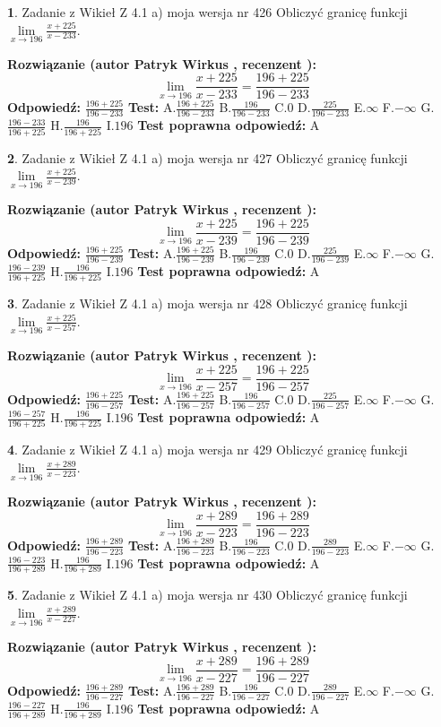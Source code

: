 \documentclass[12pt, a4paper]{article}
\theoremstyle{definition} %
\newtheorem{zad}{}
\newcommand{\zadStart}[1]{\begin{zad}#1\newline}
\newcommand{\zadStop}{\end{zad}}
\newcommand{\rozwStart}[2]{\noindent \textbf{Rozwiązanie (autor #1 , recenzent #2): }\newline}
\newcommand{\rozwStop}{\newline}
\newcommand{\odpStart}{\noindent \textbf{Odpowiedź:}\newline}
\newcommand{\odpStop}{\newline}
\newcommand{\testStart}{\noindent \textbf{Test:}\newline}
\newcommand{\testStop}{\newline}
\newcommand{\kluczStart}{\noindent \textbf{Test poprawna odpowiedź:}\newline}
\newcommand{\kluczStop}{\newline}
\begin{document}
\zadStart{Zadanie z Wikieł Z 4.1 a) moja wersja nr 426}
Obliczyć granicę funkcji $\lim\limits_{x\to196}\frac{x+225}{x-233}$.
\zadStop
\rozwStart{Patryk Wirkus}{}
$$\lim\limits_{x\to196}\frac{x+225}{x-233} = \frac{196+225}{196-233}$$
\rozwStop
\odpStart
$\frac{196+225}{196-233}$
\odpStop
\testStart
A.$\frac{196+225}{196-233}$
B.$\frac{196}{196-233}$
C.$0$
D.$\frac{225}{196-233}$
E.$\infty$
F.$-\infty$
G.$\frac{196-233}{196+225}$
H.$\frac{196}{196+225}$
I.$196$
\testStop
\kluczStart
A
\kluczStop



\zadStart{Zadanie z Wikieł Z 4.1 a) moja wersja nr 427}
Obliczyć granicę funkcji $\lim\limits_{x\to196}\frac{x+225}{x-239}$.
\zadStop
\rozwStart{Patryk Wirkus}{}
$$\lim\limits_{x\to196}\frac{x+225}{x-239} = \frac{196+225}{196-239}$$
\rozwStop
\odpStart
$\frac{196+225}{196-239}$
\odpStop
\testStart
A.$\frac{196+225}{196-239}$
B.$\frac{196}{196-239}$
C.$0$
D.$\frac{225}{196-239}$
E.$\infty$
F.$-\infty$
G.$\frac{196-239}{196+225}$
H.$\frac{196}{196+225}$
I.$196$
\testStop
\kluczStart
A
\kluczStop



\zadStart{Zadanie z Wikieł Z 4.1 a) moja wersja nr 428}
Obliczyć granicę funkcji $\lim\limits_{x\to196}\frac{x+225}{x-257}$.
\zadStop
\rozwStart{Patryk Wirkus}{}
$$\lim\limits_{x\to196}\frac{x+225}{x-257} = \frac{196+225}{196-257}$$
\rozwStop
\odpStart
$\frac{196+225}{196-257}$
\odpStop
\testStart
A.$\frac{196+225}{196-257}$
B.$\frac{196}{196-257}$
C.$0$
D.$\frac{225}{196-257}$
E.$\infty$
F.$-\infty$
G.$\frac{196-257}{196+225}$
H.$\frac{196}{196+225}$
I.$196$
\testStop
\kluczStart
A
\kluczStop



\zadStart{Zadanie z Wikieł Z 4.1 a) moja wersja nr 429}
Obliczyć granicę funkcji $\lim\limits_{x\to196}\frac{x+289}{x-223}$.
\zadStop
\rozwStart{Patryk Wirkus}{}
$$\lim\limits_{x\to196}\frac{x+289}{x-223} = \frac{196+289}{196-223}$$
\rozwStop
\odpStart
$\frac{196+289}{196-223}$
\odpStop
\testStart
A.$\frac{196+289}{196-223}$
B.$\frac{196}{196-223}$
C.$0$
D.$\frac{289}{196-223}$
E.$\infty$
F.$-\infty$
G.$\frac{196-223}{196+289}$
H.$\frac{196}{196+289}$
I.$196$
\testStop
\kluczStart
A
\kluczStop



\zadStart{Zadanie z Wikieł Z 4.1 a) moja wersja nr 430}
Obliczyć granicę funkcji $\lim\limits_{x\to196}\frac{x+289}{x-227}$.
\zadStop
\rozwStart{Patryk Wirkus}{}
$$\lim\limits_{x\to196}\frac{x+289}{x-227} = \frac{196+289}{196-227}$$
\rozwStop
\odpStart
$\frac{196+289}{196-227}$
\odpStop
\testStart
A.$\frac{196+289}{196-227}$
B.$\frac{196}{196-227}$
C.$0$
D.$\frac{289}{196-227}$
E.$\infty$
F.$-\infty$
G.$\frac{196-227}{196+289}$
H.$\frac{196}{196+289}$
I.$196$
\testStop
\kluczStart
A
\kluczStop
\end{document}
